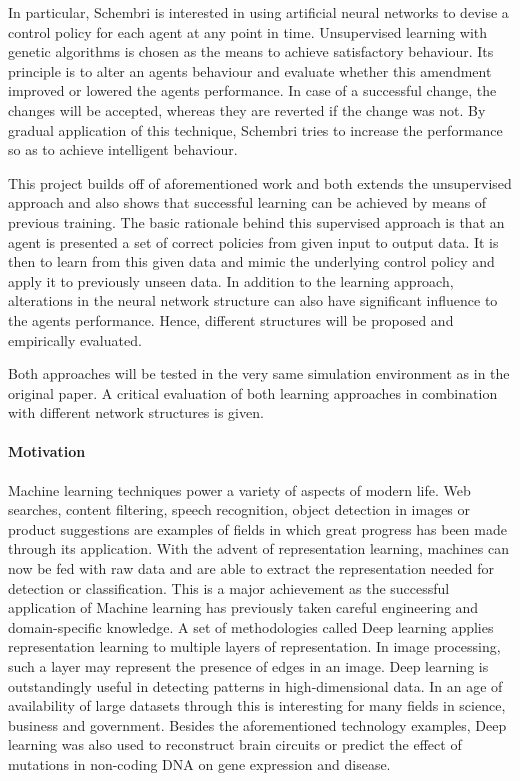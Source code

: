 \documentclass[10pt,a4paper,DIV=11]{scrreprt}
\begin{document}
In particular, Schembri is interested in using artificial neural networks to devise a control policy for each agent at any point in time. 
Unsupervised learning with genetic algorithms is chosen as the means to achieve satisfactory behaviour. Its principle is to alter 
an agents behaviour and evaluate whether this amendment improved or lowered the agents performance. In case of a successful change, the changes
will be accepted, whereas they are reverted if the change was not. By gradual application of this technique, Schembri tries to increase
the performance so as to achieve intelligent behaviour.


This project builds off of aforementioned work and both extends the unsupervised approach and also shows that successful learning can be 
achieved by means of previous training. The basic rationale behind this supervised approach is that an agent is presented a set of correct 
policies from given input to output data. It is then to learn from this given data and mimic the underlying control policy and apply it to
previously unseen data. In addition to the learning approach, alterations in the neural network structure can also have significant influence
to the agents performance. Hence, different structures will be proposed and empirically evaluated.

Both approaches will be tested in the very same simulation environment as in the original paper. A critical evaluation of both learning approaches
in combination with different network structures is given.

\paragraph{Motivation}
Machine learning techniques power a variety of aspects of modern life. Web searches, content filtering, speech recognition, object detection in
images or product suggestions are examples of fields in which great progress has been made through its application.  
With the advent of representation learning, machines can now be fed with raw data and are able to extract the representation needed for detection
or classification. This is a major achievement as the successful application of Machine learning has previously taken careful engineering and
domain-specific knowledge. A set of methodologies called Deep learning applies representation learning to multiple layers of representation. 
In image processing, such a layer may represent the presence of edges in an image. Deep learning is outstandingly useful in detecting patterns in 
high-dimensional data. In an age of availability of large datasets through this is interesting for many fields in science, business and government.
Besides the aforementioned technology examples, Deep learning was also used to reconstruct brain circuits or predict the effect of mutations in
non-coding DNA on gene expression and disease. \cite{DEEPLEARNING}
\end{document}
